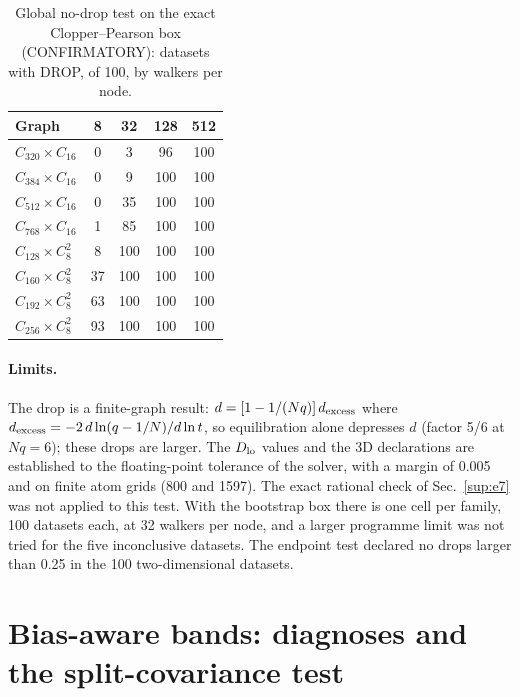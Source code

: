 \documentclass[aps,pre,twocolumn,superscriptaddress,nofootinbib,10pt]{revtex4-2}
\begin{document}
\begin{table}[t]
\caption{Global no-drop test on the exact Clopper--Pearson box (CONFIRMATORY): datasets with DROP, of 100, by walkers per node.}
\label{tab:cpmap}
\begin{ruledtabular}
\footnotesize
\begin{tabular}{lcccc}
Graph & 8 & 32 & 128 & 512 \\
\hline
$C_{320}\times C_{16}$ & 0 & 3 & 96 & 100 \\
$C_{384}\times C_{16}$ & 0 & 9 & 100 & 100 \\
$C_{512}\times C_{16}$ & 0 & 35 & 100 & 100 \\
$C_{768}\times C_{16}$ & 1 & 85 & 100 & 100 \\
$C_{128}\times C_8^2$ & 8 & 100 & 100 & 100 \\
$C_{160}\times C_8^2$ & 37 & 100 & 100 & 100 \\
$C_{192}\times C_8^2$ & 63 & 100 & 100 & 100 \\
$C_{256}\times C_8^2$ & 93 & 100 & 100 & 100 \\
\end{tabular}
\end{ruledtabular}
\end{table}

\paragraph*{Limits.}
The drop is a finite-graph result: $d=[1-1/(Nq)]\,d_{\rm excess}$ where $d_{\rm excess}=-2\,d\ln(q-1/N)/d\ln t$, so equilibration alone depresses $d$ (factor 5/6 at $Nq=6$); these drops are larger. The $D_{\rm lo}$ values and the 3D declarations are established to the floating-point tolerance of the solver, with a margin of 0.005 and on finite atom grids (800 and 1597). The exact rational check of Sec.~\ref{sup:e7} was not applied to this test. With the bootstrap box there is one cell per family, 100 datasets each, at 32 walkers per node, and a larger programme limit was not tried for the five inconclusive datasets. The endpoint test declared no drops larger than 0.25 in the 100 two-dimensional datasets.

\section{Bias-aware bands: diagnoses and the split-covariance test}\label{sup:e4}
\end{document}
